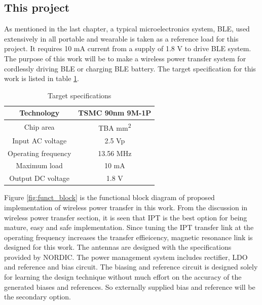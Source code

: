 \documentclass[12pt,a4paper,UKenglish]{article}
\begin{document}
\subsection{This project}
As mentioned in the last chapter, a typical microelectronics system, BLE, used extensively in all portable and 
wearable is taken as a reference load for this project. It requires 10 mA current from a supply of 1.8 V to drive 
BLE system. The purpose of this work will be to make a wireless power transfer system for cordlessly driving BLE 
or charging BLE battery. The target specification for this work is listed in table \ref{tab:proj_spec_tar}. \\

\begin{table}[!htbp]
\caption{Target specifications}
\begin{center}
\begin{tabular}{c|c}
\hline \hline
Technology 		& TSMC 90nm 9M-1P\\ \hline
Chip area 		& TBA mm\textsuperscript{2} \\ \hline
Input AC voltage	& 2.5 Vp \\ \hline
Operating frequency  	& 13.56 MHz \\ \hline
Maximum load 		& 10 mA \\ \hline
Output DC voltage 	& 1.8 V \\ 
\hline \hline
\end{tabular}
\end{center}
\label{tab:proj_spec_tar}
\end{table}

Figure \ref{fig:funct_block} is the functional block diagram of proposed implementation of wireless power transfer in 
this work. From the discussion in wireless power transfer section, it is seen that IPT is the best option for 
being mature, easy and safe implementation. Since tuning the IPT transfer link at the operating frequency 
increases the transfer effieicency, magnetic resonance link is designed for this work. The antennas are designed 
with the specifications provided by NORDIC. The power management system includes rectifier, LDO and reference and bias circuit. The biasing and reference circuit is designed solely for 
learning the design technique without much effort on the accuracy of the generated biases and references. So 
externally supplied bias and reference will be the secondary option. \\
\end{document}
